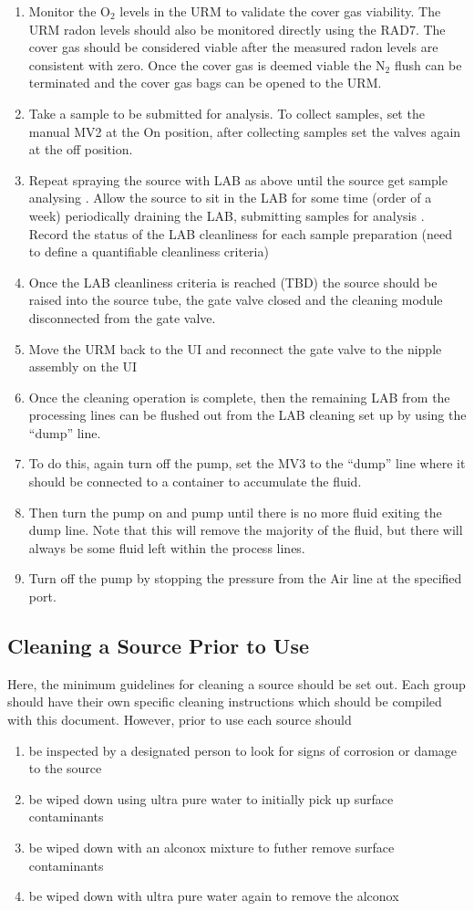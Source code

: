 \begin{enumerate}
\item Monitor the O$_2$ levels in the URM to validate the cover gas viability. The URM radon levels should also be monitored directly using the RAD7. The cover gas should be considered viable after the measured radon levels are consistent with zero. Once the cover gas is deemed viable the N$_{2}$ flush can be terminated and the cover gas bags can be opened to the URM. 
\item Take a sample to be submitted for analysis. To collect samples, set the manual MV2 at the On position, after collecting samples set the valves again at the off position.
\item Repeat spraying the source with LAB as above until the source get sample analysing . Allow the source to sit in the LAB for some time (order of a week) periodically draining the LAB, submitting samples for analysis . Record the status of the LAB cleanliness for each sample preparation (need to define a quantifiable cleanliness criteria)
\item Once the LAB cleanliness criteria is reached (TBD) the source should be raised into the source tube, the gate valve closed and the cleaning module disconnected from the gate valve. 
\item Move the URM back to the UI and reconnect the gate valve to the nipple assembly on the UI
\item Once the cleaning operation is complete, then the remaining LAB from the processing lines can be flushed out from the LAB cleaning set up by using the “dump” line. 
\item To do this, again turn off the pump, set the MV3 to the “dump” line where it should be connected to a container to accumulate the fluid. 
\item Then turn the pump on and pump until there is no more fluid exiting the dump line. Note that this will remove the majority of the fluid, but there will always be some fluid left within the process lines. 
\item Turn off the pump by stopping the pressure from the Air line at the specified port. 
\end{enumerate}

\subsection{Cleaning a Source Prior to Use}
Here, the minimum guidelines for cleaning a source should be set out. Each group should have their own specific cleaning instructions which should be compiled with this document. However, prior to use each source should
\begin{enumerate}
\item be inspected by a designated person to look for signs of corrosion or damage to the source
\item be wiped down using ultra pure water to initially pick up surface contaminants
\item be wiped down with an alconox mixture to futher remove surface contaminants
\item be wiped down with ultra pure water again to remove the alconox
\end{enumerate}

